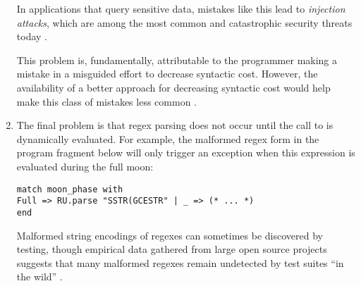 \begin{enumerate}
In applications that query sensitive data, mistakes like this lead to \emph{injection attacks}, which are among the most common and catastrophic security threats today \cite{owasp2013}.

This problem is, fundamentally, attributable to the programmer making a mistake in a misguided effort to decrease syntactic cost. However, the availability of a better approach for decreasing syntactic cost would help make this class of mistakes less common \cite{Bravenboer:2007:PIA:1289971.1289975}. %



\item The final problem is that regex parsing does not occur until the call to  is dynamically evaluated. For example, the malformed regex form in the program fragment below will only trigger an exception when this expression is evaluated during the full moon: %

\begin{lstlisting}[numbers=none]
match moon_phase with 
Full => RU.parse "SSTR(GCESTR" | _ => (* ... *)
end
\end{lstlisting}
Malformed string encodings of regexes can sometimes be discovered by testing, though empirical data gathered from large open source projects suggests that  many malformed regexes remain undetected by test suites ``in the wild'' \cite{spishak2012type}.


\end{enumerate}
